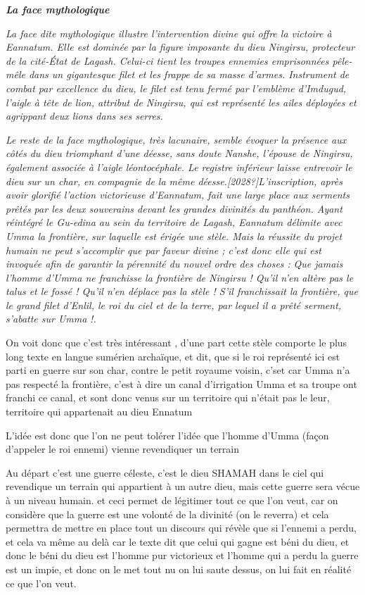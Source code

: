\documentclass[a4paper,10pt]{article}
\begin{document}
\begin{itemize}
\textbf{\textit{La face {\textquotedbl}mythologique{\textquotedbl}}}

\textit{La face dite {\textquotedbl}mythologique{\textquotedbl} illustre
l'intervention divine qui offre la victoire à
Eannatum. Elle est dominée par la figure imposante du dieu Ningirsu,
protecteur de la cité-État de Lagash. Celui-ci tient les troupes
ennemies emprisonnées pêle-mêle dans un gigantesque filet et les frappe
de sa masse d'armes. Instrument de combat par
excellence du dieu, le filet est tenu fermé par
l'emblème d'Imdugud,
l'aigle à tête de lion, attribut de Ningirsu, qui est
représenté les ailes déployées et agrippant deux lions dans ses
serres.}

\textit{Le reste de la face {\textquotedbl}mythologique{\textquotedbl},
très lacunaire, semble évoquer la présence aux côtés du dieu triomphant
d'une déesse, sans doute Nanshe,
l'épouse de Ningirsu, également associée à
l'aigle léontocéphale. Le registre inférieur laisse
entrevoir le dieu sur un char, en compagnie de la même
déesse.[2028?]L'inscription, après avoir glorifié
l'action victorieuse d'Eannatum, fait
une large place aux serments prêtés par les deux souverains devant les
grandes divinités du panthéon. Ayant réintégré le Gu-edina au sein du
territoire de Lagash, Eannatum délimite avec Umma la frontière, sur
laquelle est érigée une stèle. Mais la réussite du projet humain ne
peut s'accomplir que par faveur divine ;
c'est donc elle qui est invoquée afin de garantir la
pérennité du nouvel ordre des choses : {\textquotedbl}}\textit{Que
jamais l'homme d'Umma ne franchisse
la frontière de Ningirsu ! Qu'il n'en
altère pas le talus et le fossé ! Qu'il
n'en déplace pas la stèle ! S'il
franchissait la frontière, que le grand filet d'Enlil,
le roi du ciel et de la terre, par lequel il a prêté serment,
s'abatte sur Umma }\textit{!{\textquotedbl}.}

On voit donc que c'est très intéressant ,
d'une part cette stèle comporte le plus long texte en
langue sumérien archaïque, et dit, que si le roi représenté ici est
parti en guerre sur son char, contre le petit royaume voisin, 
c'set car Umma n'a pas respecté la
frontière, c'est à dire un canal
d'irrigation Umma et sa troupe ont franchi ce canal,
et sont donc venus sur un territoire qui n'était pas
le leur, territoire qui appartenait au dieu Ennatum

L'idée est donc que l'on ne peut
tolérer l'idée que l'homme
d'Umma (façon d'appeler le roi
ennemi) vienne revendiquer un terrain 

Au départ c'est une guerre céleste,
c'est le dieu SHAMAH dans le ciel qui revendique un
terrain qui appartient à un autre dieu, mais cette guerre sera vécue à
un niveau humain. et ceci permet de légitimer tout ce que
l'on veut, car on considère que la guerre est une
volonté de la divinité (on le reverra) et cela permettra de mettre en
place tout un discours qui révèle que si l'ennemi a
perdu, et cela va même au delà car le texte dit que celui qui gagne est
béni du dieu, et donc le béni du dieu est l'homme pur
victorieux et l'homme qui a perdu la guerre est un
impie, et donc on le met tout nu on lui saute dessus, on lui fait en
réalité ce que l'on veut. 


\end{itemize}
\end{document}
